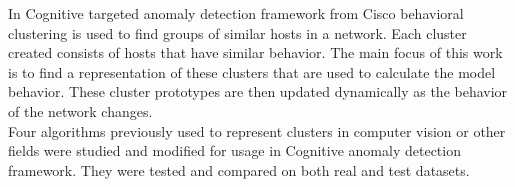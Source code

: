 \documentclass[thesis=B,english]{FITthesis}[2012/10/20]
\begin{document}
In Cognitive targeted anomaly detection framework from Cisco behavioral clustering is used to find groups of similar hosts in a network.
Each cluster created consists of hosts that have similar behavior.
The main focus of this work is to find a representation of these clusters that are used to calculate the model behavior.
These cluster prototypes are then updated dynamically as the behavior of the network changes. \\

Four algorithms previously used to represent clusters in computer vision or other fields were studied and modified for usage in Cognitive anomaly detection framework.
They were tested and compared on both real and test datasets. \\


%

%
\end{document}
